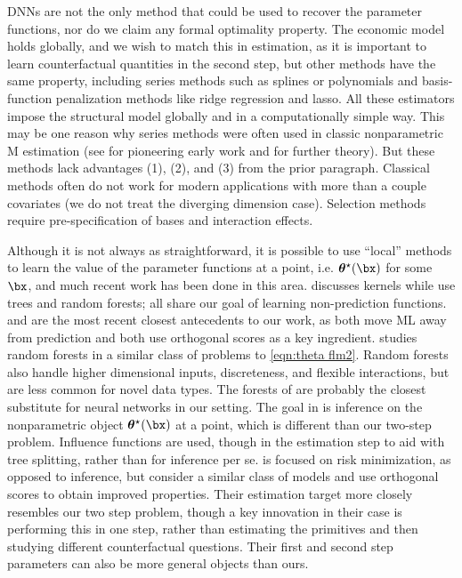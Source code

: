 \documentclass[12pt]{article}
\numberwithin{equation}{section}
\theoremstyle{definition}
\newcommand{\btheta}{\boldsymbol{\theta}}
\newcommand{\bttrue}{\btheta^\star}
\begin{document}
DNNs are not the only method that could be used to recover the parameter functions, nor do we claim any formal optimality property. The economic model holds globally, and we wish to match this in estimation, as it is important to learn counterfactual quantities in the second step, but other methods have the same property, including series methods such as splines or polynomials and basis-function penalization methods like ridge regression and lasso. All these estimators impose the structural model globally and in a computationally simple way. This may be one reason why series methods were often used in classic nonparametric M estimation (see \cite{Gallant-Nychka1987_Ecma} for pioneering early work and \cite{Chen2007_handbook} for further theory). But these methods lack advantages (1), (2), and (3) from the prior paragraph. Classical methods often do not work for modern applications with more than a couple covariates (we do not treat the diverging dimension case). Selection methods require pre-specification of bases and interaction effects. 


Although it is not always as straightforward, it is possible to use ``local'' methods to learn the value of the parameter functions at a point, i.e. $\bttrue(\bx)$ for some $\bx$, and much recent work has been done in this area. \cite{Fan-Zhang2008_SII} discusses kernels while \cite{Zeileis-Hothorn-Hornik2008_JCGS,Athey-Tibshirani-Wager2019_AoS,Nekipelov-Novosad-Ryan2019_WP,Chatla-Shmueli2020_JCGS} use trees and random forests; all share our goal of learning non-prediction functions. \cite{Athey-Tibshirani-Wager2019_AoS} and \cite{Foster-Syrgkanis2023_AoS} are the most recent closest antecedents to our work, as both move ML away from prediction and both use orthogonal scores as a key ingredient. \cite{Athey-Tibshirani-Wager2019_AoS} studies random forests in a similar class of problems to \eqref{eqn:theta flm2}. Random forests also handle higher dimensional inputs, discreteness, and flexible interactions, but are less common for novel data types. The forests of \cite{Athey-Tibshirani-Wager2019_AoS} are probably the closest substitute for neural networks in our setting. The goal in \cite{Athey-Tibshirani-Wager2019_AoS} is inference on the nonparametric object $\bttrue(\bx)$ at a point, which is different than our two-step problem. Influence functions are used, though in the estimation step to aid with tree splitting, rather than for inference per se. \cite{Foster-Syrgkanis2023_AoS} is focused on risk minimization, as opposed to inference, but consider a similar class of models and use orthogonal scores to obtain improved properties. Their estimation target more closely resembles our two step problem, though a key innovation in their case is performing this in one step, rather than estimating the primitives and then studying different counterfactual questions. Their first and second step parameters can also be more general objects than ours. 
\end{document}
